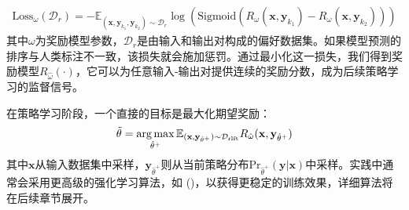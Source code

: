 \begin{eqnarray}
\mathrm{Loss}_{\omega}(\mathcal{D}_r) = -\mathbb{E}_{(\mathbf{x},\mathbf{y}_{k_1},\mathbf{y}_{k_2}) \sim \mathcal{D}_r} \log(\mathrm{Sigmoid}(R_{\omega}(\mathbf{x},\mathbf{y}_{k_1}) - R_{\omega}(\mathbf{x},\mathbf{y}_{k_2})))
\end{eqnarray}
其中$\omega$为奖励模型参数，$\mathcal{D}_r$是由输入和输出对构成的偏好数据集。如果模型预测的排序与人类标注不一致，该损失就会施加惩罚。通过最小化这一损失，我们得到奖励模型$R_{\hat{\omega}}(\cdot)$，它可以为任意输入-输出对提供连续的奖励分数，成为后续策略学习的监督信号。

在策略学习阶段，一个直接的目标是最大化期望奖励：
\begin{eqnarray}
\tilde{\theta} = \operatorname*{arg\,max}_{\hat{\theta}^+} \mathbb{E}_{(\mathbf{x},\mathbf{y}_{\hat{\theta}^+}) \sim \mathcal{D}_{\mathrm{rlft}}} R_{\hat{\omega}}(\mathbf{x},\mathbf{y}_{\hat{\theta}^+})
\end{eqnarray}
其中$\mathbf{x}$从输入数据集中采样，$\mathbf{y}_{\hat{\theta}^+}$则从当前策略分布$\mathrm{Pr}_{\hat{\theta}^+}(\mathbf{y}|\mathbf{x})$中采样。实践中通常会采用更高级的强化学习算法，如 ()，以获得更稳定的训练效果，详细算法将在后续章节展开。





